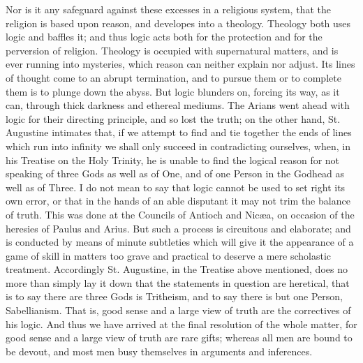 Nor is it any safeguard against these excesses in a religious system,
that the religion is based upon reason, and developes into a theology.
Theology both uses logic and baffles it; and thus logic acts both for
the protection and for the perversion of religion. Theology is occupied
with supernatural matters, and is ever running into mysteries, which
reason can neither explain nor adjust. Its lines of thought come to an
abrupt termination, and to pursue them or to complete them is to plunge
down the abyss. But logic blunders on, forcing its way, as it can,
through thick darkness and ethereal mediums. The Arians went ahead with
logic for their directing principle, and so lost the truth; on the other
hand, St. Augustine intimates that, if we attempt to find and tie
together the ends of lines which run into infinity we shall only succeed
in contradicting ourselves, when, in his Treatise on the Holy Trinity,
he is unable to find the logical reason for not speaking of three Gods
as well as of One, and of one Person in the Godhead as well as of Three.
I do not mean to say that logic cannot be used to set right its own
error, or that in the hands of an able disputant it may not trim the
balance of truth. This was done at the Councils of Antioch and Nicæa,
on occasion of the heresies of Paulus and Arius. But such a process is
circuitous and elaborate; and is conducted by means of minute subtleties
which will give it the appearance of a game of skill in matters too
grave and practical to deserve a mere scholastic treatment. Accordingly
St. Augustine, in the Treatise above mentioned, does no more than simply
lay it down that the statements in question are heretical, that is to
say there are three Gods is Tritheism, and to say there is but one
Person, Sabellianism. That is, good sense and a large view of truth are
the correctives of his logic. And thus we have arrived at the final
resolution of the whole matter, for good sense and a large view of truth
are rare gifts; whereas all men are bound to be devout, and most men
busy themselves in arguments and inferences.

